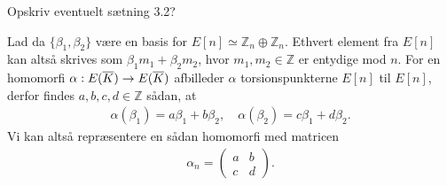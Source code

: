 Opskriv eventuelt sætning 3.2?

Lad da $\{\beta_1, \beta_2\}$ være en basis for $E[n] \simeq \mathbb{Z}_n \oplus \mathbb{Z}_n$. Ethvert element fra $E[n]$ kan altså skrives som $\beta_1 m_1 + \beta_2 m_2$, hvor $m_1, m_2 \in \mathbb{Z}$ er entydige mod $n$. For en homomorfi $\alpha : E(\overline{K}) \to E(\overline{K})$ afbilleder $\alpha$ torsionspunkterne $E[n]$ til $E[n]$, derfor findes $a, b, c, d \in \mathbb{Z}$ sådan, at 
\begin{align*}
	\alpha(\beta_1) = a \beta_1 + b \beta_2, \quad \alpha(\beta_2) = c\beta_1 + d \beta_2.
\end{align*}
Vi kan altså repræsentere en sådan homomorfi med matricen
\begin{align*}
	\alpha_n = \left( 
	\begin{matrix}
		a & b \\ 
		c & d 
	\end{matrix} \right).
\end{align*}

